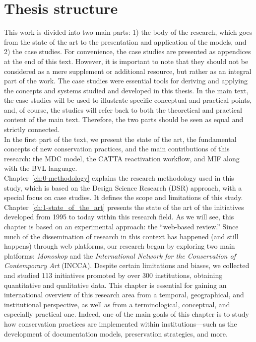\section*{Thesis structure}
This work is divided into two main parts: 1) the body of the research, which goes from the state of the art to the presentation and application of the models, and 2) the case studies. For convenience, the case studies are presented as appendices at the end of this text. However, it is important to note that they should not be considered as a mere supplement or additional resource, but rather as an integral part of the work. The case studies were essential tools for deriving and applying the concepts and systems studied and developed in this thesis. In the main text, the case studies will be used to illustrate specific conceptual and practical points, and, of course, the studies will refer back to both the theoretical and practical content of the main text. Therefore, the two parts should be seen as equal and strictly connected.\\
\newline
In the first part of the text, we present the state of the art, the fundamental concepts of new conservation practices, and the main contributions of this research: the MDC model, the CATTA reactivation workflow, and MIF along with the BVL language.\\
Chapter~\ref{ch:0-methodology} explains the research methodology used in this study, which is based on the Design Science Research (DSR) approach, with a special focus on case studies. It defines the scope and limitations of this study.\\
Chapter~\ref{ch:1-state_of_the_art} presents the state of the art of the initiatives developed from 1995 to today within this research field. As we will see, this chapter is based on an experimental approach: the ``web-based review.'' Since much of the dissemination of research in this context has happened (and still happens) through web platforms, our research began by exploring two main platforms: \textit{Monoskop} and the \textit{International Network for the Conservation of Contemporary Art} (INCCA). Despite certain limitations and biases, we collected and studied 113 initiatives promoted by over 300 institutions, obtaining quantitative and qualitative data. This chapter is essential for gaining an international overview of this research area from a temporal, geographical, and institutional perspective, as well as from a terminological, conceptual, and especially practical one. Indeed, one of the main goals of this chapter is to study how conservation practices are implemented within institutions—such as the development of documentation models, preservation strategies, and more.\\
